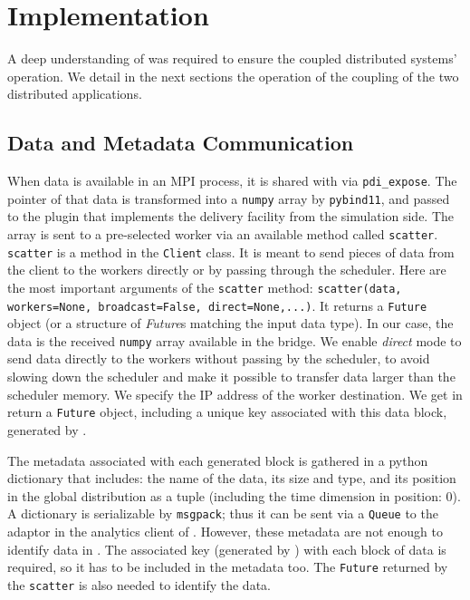 \section{Implementation}

A deep understanding of \dask was required to ensure the coupled distributed systems' operation. We detail in the next sections the operation of the coupling of the two distributed applications.

\subsection{Data and Metadata Communication}\label{sec:datametadacomm}

When data is available in an MPI process, it is shared with \pdi via \texttt{pdi\_expose}. The pointer of that data is transformed into a \texttt{numpy} array by \texttt{pybind11}, and passed to the \deisa plugin that implements the delivery facility from the simulation side. 
The array is sent to a pre-selected \dask worker via an available method called \texttt{scatter}. 
\texttt{scatter} is a method in the \dask \texttt{Client} class. It is meant to send pieces of data from the client to the workers directly or by passing through the scheduler. Here are the most important arguments of the \texttt{scatter} method: 
\texttt{scatter(data, workers=None, broadcast=False, direct=None,...)}. 
It returns a \texttt{Future} object (or a structure of \textit{Future}s matching the input data type).
In our case, the data is the received \texttt{numpy} array available in the bridge. We enable \textit{direct} mode to send data directly to the workers without passing by the scheduler, to avoid slowing down the scheduler and make it possible to transfer data larger than the scheduler memory. We specify the IP address of the worker destination. We get in return a \texttt{Future} object, including a unique key associated with this data block, generated by \dask.


The metadata associated with each generated block is gathered in a python dictionary that includes:  the name of the data, its size and type, and its position in the global distribution as a tuple (including the time dimension in position: 0).  A dictionary is serializable by \texttt{msgpack}; thus it can be sent via a \texttt{Queue} to the \deisa adaptor in the analytics client of \dask. However, these metadata are not enough to identify data in \dask. The associated key (generated by \dask) with each block of data is required, so it has to be included in the metadata too. The \texttt{Future} returned by the \texttt{scatter} is also needed to identify the data.

